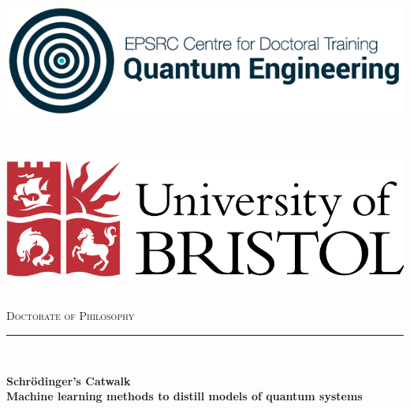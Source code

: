 \begin{titlepage}

    \newcommand{\HRule}{\rule{\linewidth}{0.5mm}} %
    
    \center %
     
    \vspace{1cm}
    \begin{minipage}{0.4\textwidth}
    \begin{flushleft} 
        \includegraphics[scale=2]{logos/qecdt.png}
    \end{flushleft}
    \end{minipage}
    ~
    \begin{minipage}{0.4\textwidth}
    \begin{flushright} \large
        \includegraphics[scale=0.2]{logos/bristol_uni.png}
    \end{flushright}
    \end{minipage}\\[1cm]
    

    \vspace{3cm}
    \textsc{
        \LARGE Doctorate of Philosophy \\
    }
    \vspace{1.5cm}
    \HRule \\[0.4cm]
    { \Huge \bfseries Schr\"odinger's Catwalk \\
     \large  Machine learning methods to distill models of quantum systems
    
}
\end{titlepage}
